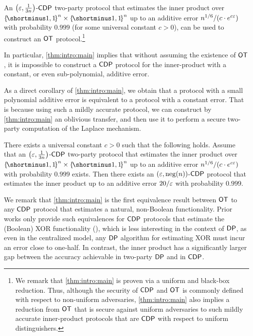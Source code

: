 \begin{theorem}\label{thm:intro:main}
    An $\paren{\eps,\frac1{3n}}$-${\sf CDP}$ two-party protocol that estimates the inner product over $\oo^n \times \oo^n$ up to an additive error $n^{1/6}/(c\cdot e^{c \varepsilon})$ with probability $0.999$ (for some universal constant $c > 0$), can be used to construct an ${\sf OT}$ protocol.\footnote{We remark that \cref{thm:intro:main} is proven via a uniform and black-box reduction. Thus, although the security of ${\sf CDP}$ and ${\sf OT}$ is commonly defined with respect to non-uniform adversaries, \cref{thm:intro:main} also implies a reduction from ${\sf OT}$ that is secure against uniform adversaries to such mildly accurate inner-product protocols that are ${\sf CDP}$ with respect to uniform distinguishers.}
\end{theorem} 

In particular, \cref{thm:intro:main} implies that without assuming the existence of ${\sf OT}$, it is impossible to construct a ${\sf CDP}$ protocol for the inner-product with a constant, or even sub-polynomial, additive error.

As a direct corollary of \cref{thm:intro:main}, we obtain that a protocol with a small polynomial additive error is equivalent to a protocol with a constant error. That is because using such a mildly accurate protocol, we can construct by \cref{thm:intro:main} an oblivious transfer, and then use it to perform a secure two-party computation of the Laplace mechanism.

\begin{corollary}
There exists a universal constant $c>0$ such that the following holds. 
    Assume that an $\paren{\eps,\frac1{3n}}$-${\sf CDP}$ two-party protocol that estimates the inner product over $\oo^n \times \oo^n$ up to an additive error $n^{1/6}/(c\cdot e^{c \varepsilon})$ with probability $0.999$ exists. Then there exists an $\paren{\eps,\negl(n)}$-${\sf CDP}$ protocol that estimates the inner product up to an additive error $20/\varepsilon$ with probability $0.999$.
\end{corollary}


We remark that \cref{thm:intro:main} is the first equivalence result between ${\sf OT}$ to any ${\sf CDP}$ protocol that estimates a natural, non-Boolean functionality.
Prior works only provide such equivalences for ${\sf CDP}$ protocols that estimate the (Boolean) XOR functionality (\cite{GKMPS16,HMSS19}), which is less interesting in the context of ${\sf DP}$, as even in the centralized model, any ${\sf DP}$ algorithm for estimating XOR must incur an error close to one-half.
In contrast, the inner product has a significantly larger gap between the accuracy achievable in two-party ${\sf DP}$ and in ${\sf CDP}$.

